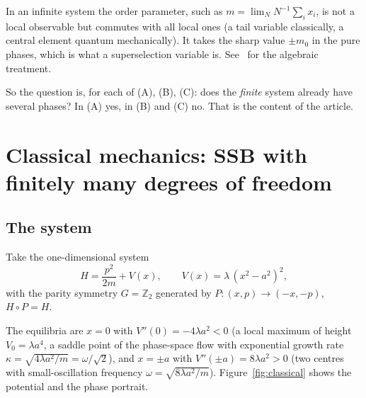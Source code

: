 \documentclass[11pt,a4paper]{article}
\theoremstyle{definition}
\theoremstyle{remark}
\newcommand{\Z}{\mathbb{Z}}
\begin{document}
In an infinite system the order parameter, such as $m=\lim_N N^{-1}\sum_ix_i$, is not a local observable but
commutes with all local ones (a tail variable classically, a central element quantum mechanically). It takes the
sharp value $\pm m_0$ in the pure phases, which is what a superselection variable is. See~\cite{Strocchi,Haag}
for the algebraic treatment.

So the question is, for each of (A), (B), (C): does the \emph{finite} system already have several phases?
In (A) yes, in (B) and (C) no. That is the content of the article.

\section{Classical mechanics: SSB with finitely many degrees of freedom}\label{sec:classical}

\subsection{The system}

Take the one-dimensional system
\begin{equation}
H=\frac{p^2}{2m}+V(x),\qquad V(x)=\lambda\,(x^2-a^2)^2,
\label{eq:H}
\end{equation}
with the parity symmetry $G=\Z_2$ generated by $P:(x,p)\to(-x,-p)$, $H\circ P=H$.

The equilibria are $x=0$ with $V''(0)=-4\lambda a^2<0$ (a local maximum of height $V_0=\lambda a^4$, a saddle
point of the phase-space flow with exponential growth rate $\kappa=\sqrt{4\lambda a^2/m}=\omega/\sqrt2$), and
$x=\pm a$ with $V''(\pm a)=8\lambda a^2>0$ (two centres with small-oscillation frequency
$\omega=\sqrt{8\lambda a^2/m}$). Figure~\ref{fig:classical} shows the potential and the phase portrait.
\end{document}
